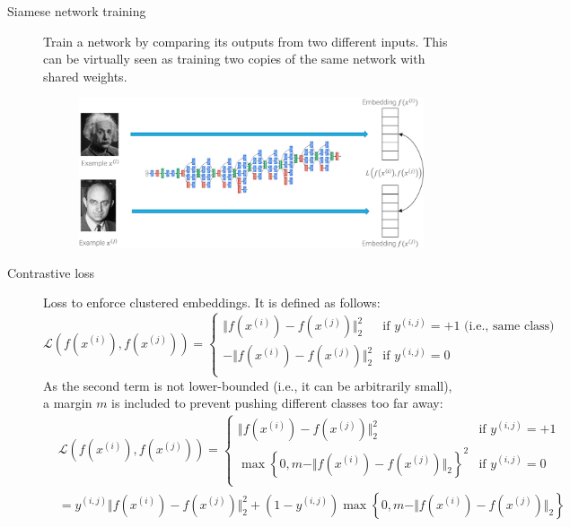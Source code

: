 \begin{description}
    \item[Siamese network training] 
        Train a network by comparing its outputs from two different inputs. This can be virtually seen as training two copies of the same network with shared weights.

        \begin{figure}[H]
            \centering
            \includegraphics[width=0.7\linewidth]{./img/_siamese_network.pdf}
        \end{figure}

        \item[Contrastive loss] 
            Loss to enforce clustered embeddings. It is defined as follows:
            \[
                \mathcal{L}\left( f(x^{(i)}), f(x^{(j)}) \right) = 
                \begin{cases}
                    \Vert f(x^{(i)}) - f(x^{(j)}) \Vert_2^2 & \text{if $y^{(i, j)} = +1$ (i.e., same class)} \\
                    - \Vert f(x^{(i)}) - f(x^{(j)}) \Vert_2^2 & \text{if $y^{(i, j)} = 0$} \\
                \end{cases}
            \]
            As the second term is not lower-bounded (i.e., it can be arbitrarily small), a margin $m$ is included to prevent pushing different classes too far away:
            \[
                \begin{split}
                    &\mathcal{L}\left( f(x^{(i)}), f(x^{(j)}) \right) = 
                    \begin{cases}
                        \Vert f(x^{(i)}) - f(x^{(j)}) \Vert_2^2 & \text{if $y^{(i, j)} = +1$} \\
                        \max\left\{0, m - \Vert f(x^{(i)}) - f(x^{(j)}) \Vert_2\right\}^2 & \text{if $y^{(i, j)} = 0$} \\
                    \end{cases} \\
                    &= y^{(i, j)} \Vert f(x^{(i)}) - f(x^{(j)}) \Vert_2^2 + (1-y^{(i, j)}) \max\left\{0, m - \Vert f(x^{(i)}) - f(x^{(j)}) \Vert_2\right\}
                \end{split}
            \]


\end{description}

